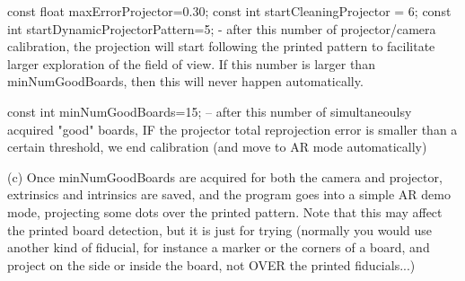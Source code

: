 const float maxErrorProjector=0.30; const int startCleaningProjector = 6; const int startDynamicProjectorPattern=5; - after this number of projector/camera calibration, the projection will start following the printed pattern to facilitate larger exploration of the field of view. If this number is larger than minNumGoodBoards, then this will never happen automatically.

const int minNumGoodBoards=15; -- after this number of simultaneoulsy acquired "good" boards, IF the projector total reprojection error is smaller than a certain threshold, we end calibration (and move to AR mode automatically)

(c) Once minNumGoodBoards are acquired for both the camera and projector, extrinsics and intrinsics are saved, and the program goes into a simple AR demo mode, projecting some dots over the printed pattern. Note that this may affect the printed board detection, but it is just for trying (normally you would use another kind of fiducial, for instance a marker or the corners of a board, and project on the side or inside the board, not OVER the printed fiducials...)



